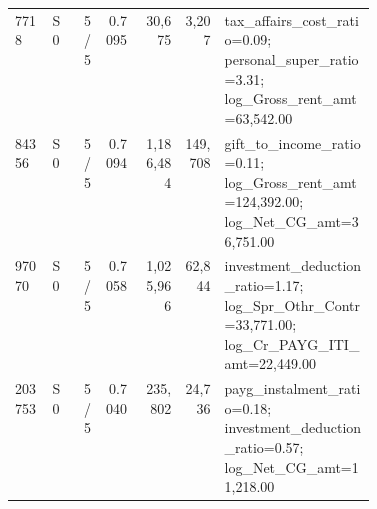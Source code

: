\begin{table}[H]
{\begin{tabular}{llrrrr p{0.42\linewidth}}
        7718 & S0 & 5/5 & 0.7095 & 30,675 & 3,207 & tax\_affairs\_cost\_ratio=0.09; personal\_super\_ratio=3.31; log\_Gross\_rent\_amt=63,542.00 \\
        84356 & S0 & 5/5 & 0.7094 & 1,186,484 & 149,708 & gift\_to\_income\_ratio=0.11; log\_Gross\_rent\_amt=124,392.00; log\_Net\_CG\_amt=36,751.00 \\
        97070 & S0 & 5/5 & 0.7058 & 1,025,966 & 62,844 & investment\_deduction\_ratio=1.17; log\_Spr\_Othr\_Contr=33,771.00; log\_Cr\_PAYG\_ITI\_amt=22,449.00 \\
        203753 & S0 & 5/5 & 0.7040 & 235,802 & 24,736 & payg\_instalment\_ratio=0.18; investment\_deduction\_ratio=0.57; log\_Net\_CG\_amt=11,218.00 \\
        \bottomrule
    \end{tabular}}
\end{table}
